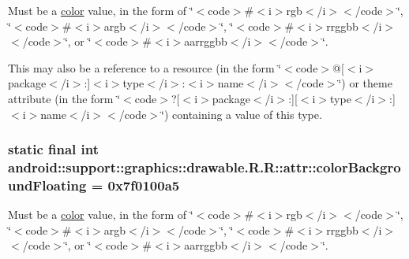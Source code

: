 Must be a \hyperlink{classandroid_1_1support_1_1graphics_1_1drawable_1_1_r_1_1color}{color} value, in the form of \char`\"{}$<$code$>$\#$<$i$>$rgb$<$/i$>$$<$/code$>$\char`\"{}, \char`\"{}$<$code$>$\#$<$i$>$argb$<$/i$>$$<$/code$>$\char`\"{}, \char`\"{}$<$code$>$\#$<$i$>$rrggbb$<$/i$>$$<$/code$>$\char`\"{}, or \char`\"{}$<$code$>$\#$<$i$>$aarrggbb$<$/i$>$$<$/code$>$\char`\"{}. 

This may also be a reference to a resource (in the form \char`\"{}$<$code$>$@\mbox{[}$<$i$>$package$<$/i$>$:\mbox{]}$<$i$>$type$<$/i$>$:$<$i$>$name$<$/i$>$$<$/code$>$\char`\"{}) or theme attribute (in the form \char`\"{}$<$code$>$?\mbox{[}$<$i$>$package$<$/i$>$:\mbox{]}\mbox{[}$<$i$>$type$<$/i$>$:\mbox{]}$<$i$>$name$<$/i$>$$<$/code$>$\char`\"{}) containing a value of this type. \hypertarget{classandroid_1_1support_1_1graphics_1_1drawable_1_1_r_1_1attr_0377d36ce4189f7c4129537db713ce89}{
\subsubsection[{colorBackgroundFloating}]{\setlength{\rightskip}{0pt plus 5cm}static final int android::support::graphics::drawable.R.R::attr::colorBackgroundFloating = 0x7f0100a5}}
\label{classandroid_1_1support_1_1graphics_1_1drawable_1_1_r_1_1attr_0377d36ce4189f7c4129537db713ce89}


Must be a \hyperlink{classandroid_1_1support_1_1graphics_1_1drawable_1_1_r_1_1color}{color} value, in the form of \char`\"{}$<$code$>$\#$<$i$>$rgb$<$/i$>$$<$/code$>$\char`\"{}, \char`\"{}$<$code$>$\#$<$i$>$argb$<$/i$>$$<$/code$>$\char`\"{}, \char`\"{}$<$code$>$\#$<$i$>$rrggbb$<$/i$>$$<$/code$>$\char`\"{}, or \char`\"{}$<$code$>$\#$<$i$>$aarrggbb$<$/i$>$$<$/code$>$\char`\"{}. 

